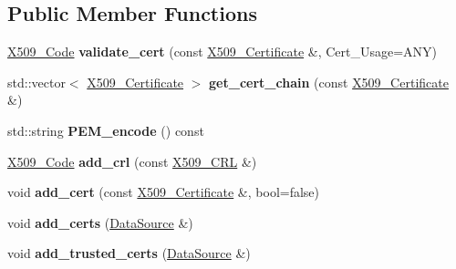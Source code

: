 \subsection*{Public Member Functions}
\begin{DoxyCompactItemize}
\item 
\hypertarget{classBotan_1_1X509__Store_a33122810048dfb0b6745e8b2b8081ab5}{\hyperlink{namespaceBotan_a4ff69afd30e1161d59676bae61c86ab5}{X509\-\_\-\-Code} {\bfseries validate\-\_\-cert} (const \hyperlink{classBotan_1_1X509__Certificate}{X509\-\_\-\-Certificate} \&, Cert\-\_\-\-Usage=A\-N\-Y)}\label{classBotan_1_1X509__Store_a33122810048dfb0b6745e8b2b8081ab5}

\item 
\hypertarget{classBotan_1_1X509__Store_ac231c722f793802972a42f284d776e72}{std\-::vector$<$ \hyperlink{classBotan_1_1X509__Certificate}{X509\-\_\-\-Certificate} $>$ {\bfseries get\-\_\-cert\-\_\-chain} (const \hyperlink{classBotan_1_1X509__Certificate}{X509\-\_\-\-Certificate} \&)}\label{classBotan_1_1X509__Store_ac231c722f793802972a42f284d776e72}

\item 
\hypertarget{classBotan_1_1X509__Store_a2210e6f6caaf8e2fed128a4bb926c03b}{std\-::string {\bfseries P\-E\-M\-\_\-encode} () const }\label{classBotan_1_1X509__Store_a2210e6f6caaf8e2fed128a4bb926c03b}

\item 
\hypertarget{classBotan_1_1X509__Store_a46d2edd52f9fa35e79424dd5e0ce7510}{\hyperlink{namespaceBotan_a4ff69afd30e1161d59676bae61c86ab5}{X509\-\_\-\-Code} {\bfseries add\-\_\-crl} (const \hyperlink{classBotan_1_1X509__CRL}{X509\-\_\-\-C\-R\-L} \&)}\label{classBotan_1_1X509__Store_a46d2edd52f9fa35e79424dd5e0ce7510}

\item 
\hypertarget{classBotan_1_1X509__Store_a2d073cb246a0a04d77956391e70e6805}{void {\bfseries add\-\_\-cert} (const \hyperlink{classBotan_1_1X509__Certificate}{X509\-\_\-\-Certificate} \&, bool=false)}\label{classBotan_1_1X509__Store_a2d073cb246a0a04d77956391e70e6805}

\item 
\hypertarget{classBotan_1_1X509__Store_a12c0bfd1cc1dc57d9e5af2f128fb9251}{void {\bfseries add\-\_\-certs} (\hyperlink{classBotan_1_1DataSource}{Data\-Source} \&)}\label{classBotan_1_1X509__Store_a12c0bfd1cc1dc57d9e5af2f128fb9251}

\item 
\hypertarget{classBotan_1_1X509__Store_a10c5a2776d3e6298ed71f9246368a49e}{void {\bfseries add\-\_\-trusted\-\_\-certs} (\hyperlink{classBotan_1_1DataSource}{Data\-Source} \&)}\label{classBotan_1_1X509__Store_a10c5a2776d3e6298ed71f9246368a49e}


\end{DoxyCompactItemize}
